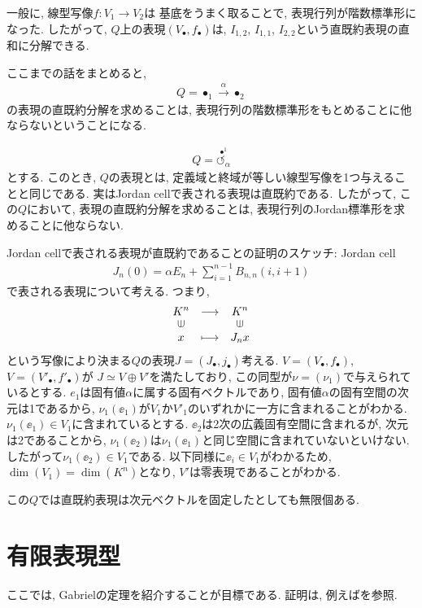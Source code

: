 \begin{example}
  一般に,
  線型写像$f\colon V_1\to V_2$は
  基底をうまく取ることで,
  表現行列が階数標準形になった.
  したがって,
  $Q$上の表現$(V_\bullet,f_\bullet)$は,
  $I_{1,2}$,
  $I_{1,1}$,
  $I_{2,2}$という直既約表現の直和に分解できる.

  ここまでの話をまとめると,
  \begin{align*}
    Q=\bullet_{1} \xrightarrow{\alpha} \bullet_{2}
  \end{align*}
  の表現の直既約分解を求めることは,
  表現行列の階数標準形をもとめることに他ならないということになる.  
\end{example}
\begin{example}
  \begin{align*}
    Q=\stackrel{\bullet^{1}}{\circlearrowleft_{\alpha}}
  \end{align*}
  とする.
  このとき, $Q$の表現とは,
  定義域と終域が等しい線型写像を1つ与えることと同じである.
  実はJordan cellで表される表現は直既約である.
  したがって, この$Q$において, 表現の直既約分解を求めることは,
  表現行列のJordan標準形を求めることに他ならない.

  Jordan cellで表される表現が直既約であることの証明のスケッチ:
  Jordan cell
  \begin{align*}
    J_n(0)=\alpha E_n+\sum_{i=1}^{n-1}B_{n,n}(i,i+1)
  \end{align*}
  で表される表現について考える.
  つまり,
  \begin{align*}
    \Shazo{K^n}{K^n}{x}{J_nx}
  \end{align*}
  という写像により決まる$Q$の表現$J=(J_\bullet, j_\bullet)$考える.
  $V=(V_\bullet,f_\bullet)$,
  $V=(V'_\bullet,f'_\bullet)$が
  $J\simeq V\oplus V'$を満たしており,
  この同型が$\nu=(\nu_1)$で与えられているとする.
  $e_1$は固有値$\alpha$に属する固有ベクトルであり,
  固有値$\alpha$の固有空間の次元は1であるから,
  $\nu_1(\ee_1)$が$V_1$か$V'_1$のいずれかに一方に含まれることがわかる.
  $\nu_1(\ee_1)\in V_1$に含まれているとする.
  $\ee_2$は2次の広義固有空間に含まれるが,
  次元は2であることから,
  $\nu_1(\ee_2)$は$\nu_1(\ee_1)$と同じ空間に含まれていないといけない.
  したがって$\nu_1(\ee_2)\in V_1$である.
  以下同様に$\ee_i\in V_1$がわかるため,
  $\dim(V_1)=\dim(K^n)$となり, $V'$は零表現であることがわかる.  

  この$Q$では直既約表現は次元ベクトルを固定したとしても無限個ある.
\end{example}


\section{有限表現型}
ここでは, Gabrielの定理を紹介することが目標である.
証明は, 例えば\cite{978-4-7853-1123-0}を参照.

